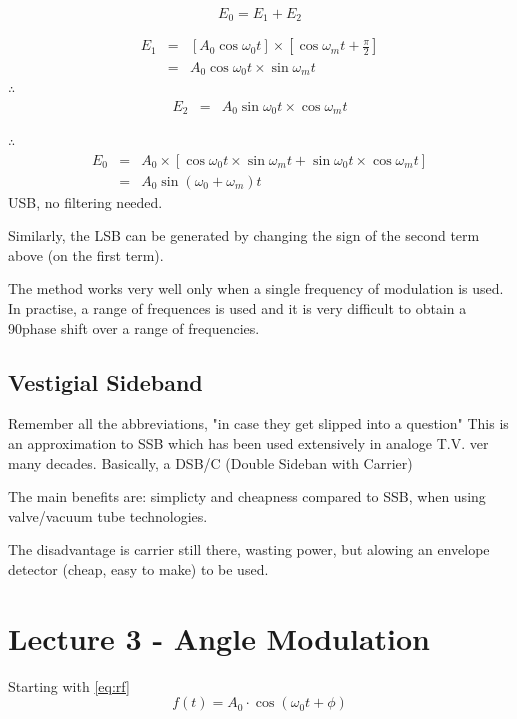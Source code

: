 \documentclass[11pt]{article} %
\begin{document}

\begin{equation}
E_0 = E_1+E_2
\end{equation}

\begin{eqnarray}
E_1 &=& \left[ A_0 \cos{\omega_0 t}\right] \times \left[ \cos{\omega_m t + \frac{\pi}{2}}\right]\nonumber \\
&=& A_0 \cos{\omega_0t}\times \sin{\omega_m t} 
\end{eqnarray}
$\therefore$
\begin{eqnarray}
E_2 &=& A_0 \sin{\omega_0t}\times \cos{\omega_m t}
\end{eqnarray}

$\therefore$
\begin{eqnarray}
E_0 &=& A_0 \times \left[\cos{\omega_0t}\times \sin{\omega_m t}+  \sin{\omega_0t}\times \cos{\omega_m t}\right] \nonumber \\
&=& A_0 \sin{\left(\omega_0 + \omega_m\right)} t
\end{eqnarray}
USB, no filtering needed.

Similarly, the LSB can be generated by changing the sign of the second term above (on the first term).

The method works very well only when a single frequency of modulation is used. In practise, a range of frequences is used and it is very difficult to obtain a 90\textdegree phase shift over a range of frequencies.

\subsection{Vestigial Sideband}
Remember all the abbreviations, "in case they get slipped into a question"
This is an approximation to SSB which has been used extensively in analoge T.V. ver many decades. Basically, a DSB/C (Double Sideban with Carrier)


The main benefits are: simplicty and cheapness compared to SSB, when using valve/vacuum tube technologies.

The disadvantage is carrier still there, wasting power, but alowing an envelope detector (cheap, easy to make) to be used.

\section{Lecture 3 - Angle Modulation}
Starting with \ref{eq:rf}
\begin{equation}
f(t) = A_0 \cdot \cos\left(\omega_0t+\phi\right)
\end{equation}
\end{document}
